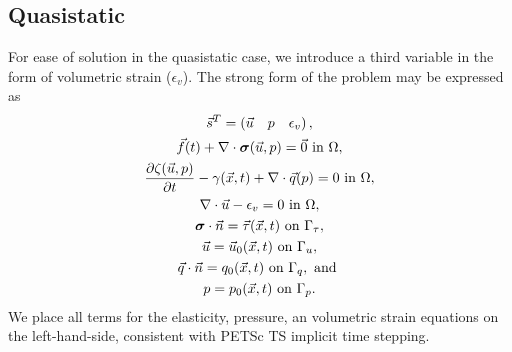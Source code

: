 \subsection{Quasistatic}

For ease of solution in the quasistatic case, we introduce a third
variable in the form of volumetric strain ($\epsilon_v$).  The
strong form of the problem may be expressed as
\begin{gather}
  \vec{s}^{T} = \left(\vec{u} \quad p \quad \epsilon_v\right), \\
  \vec{f}(t) + \nabla \cdot \bm{\sigma}(\vec{u},p) = \vec{0} \text{ in } \Omega, \\
  \frac{\partial \zeta(\vec{u},p)}{\partial t} - \gamma(\vec{x},t) + \nabla \cdot \vec{q}(p) = 0 \text{ in } \Omega, \\
  \nabla \cdot \vec{u} - \epsilon_{v} = 0 \text{ in } \Omega, \\
  \bm{\sigma} \cdot \vec{n} = \vec{\tau}(\vec{x},t) \text{ on } \Gamma_{\tau}, \\
  \vec{u} = \vec{u}_0(\vec{x}, t) \text{ on } \Gamma_{u}, \\
  \vec{q} \cdot \vec{n} = q_0(\vec{x}, t) \text{ on } \Gamma_{q}, \text{ and } \\
  p = p_0(\vec{x},t) \text{ on } \Gamma_{p}.
\end{gather}
We place all terms for the elasticity, pressure, an volumetric strain
equations on the left-hand-side, consistent with PETSc TS implicit
time stepping.

